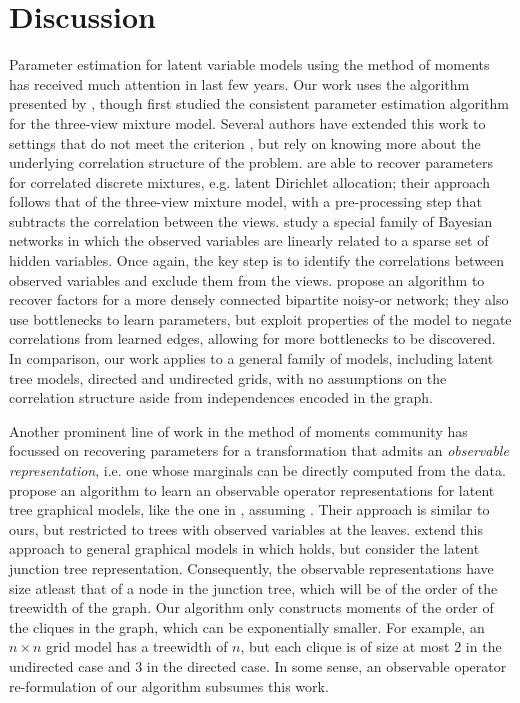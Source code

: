 \section{Discussion}
\label{sec:discussion}

Parameter estimation for latent variable models using the method of
  moments has received much attention in last few years.
Our work uses the \TensorFactorize algorithm presented by
  \citet{anandkumar13tensor}, though \citet{anandkumar12moments} first
  studied the consistent parameter estimation algorithm for the
  three-view mixture model.
Several authors have extended this work to settings that do not meet the
  criterion , but rely on knowing more about
  the underlying correlation structure of the problem.
\citet{anandkumar12lda} are able to recover parameters for correlated
  discrete mixtures, e.g. latent Dirichlet allocation; their approach
  follows that of the three-view mixture model, with a pre-processing step
  that subtracts the correlation between the views.
\citet{anandkumar2013linear} study a special family of Bayesian networks
  in which the observed variables are linearly related to a sparse set of
  hidden variables. Once again, the key step is to identify the
  correlations between observed variables and exclude them from the views.
\citet{halpern13noisyor} propose an algorithm to recover factors for
  a more densely connected bipartite noisy-or network; they also use
  bottlenecks to learn parameters, but exploit properties of the model
  to negate correlations from learned edges, allowing for more
  bottlenecks to be discovered. 
In comparison, our work applies to a general family of models, including
  latent tree models, directed and undirected grids, with no assumptions
  on the correlation structure aside from independences encoded in the
  graph. 

Another prominent line of work in the method of moments community has
  focussed on recovering parameters for a transformation that admits an {\em observable
  representation}, i.e. one whose marginals can be directly computed from the data.
\citet{song2011spectral} propose an algorithm to learn an observable
  operator representations for latent tree graphical models, like the
  one in , assuming . 
Their approach is similar to ours, but restricted to trees with observed
  variables at the leaves.
\citet{parikh12spectral} extend this approach to general graphical
  models in which  holds, but consider the latent
  junction tree representation. 
Consequently, the observable representations have size atleast that of
  a node in the junction tree, which will be of the order of the treewidth
  of the graph. 
Our algorithm only constructs moments of the order of the cliques in the
  graph, which can be exponentially smaller. 
For example, an $n\times n$ grid model has a treewidth of $n$, but each
  clique is of size at most $2$ in the undirected case and $3$ in the
  directed case.
In some sense, an observable operator re-formulation of our algorithm
  subsumes this work.


